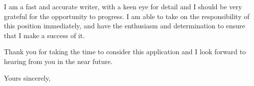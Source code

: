\documentclass[a4paper]{ReadableCV}
\begin{document}
I am a fast and accurate writer, with a keen eye for detail and I should be very grateful for the opportunity to progress. I am able to take on the responsibility of this position immediately, and have the enthusiasm and determination to ensure that I make a success of it.

Thank you for taking the time to consider this application and I look forward to hearing from you in the near future.

\bigskip

Yours sincerely, %

\end{document}
